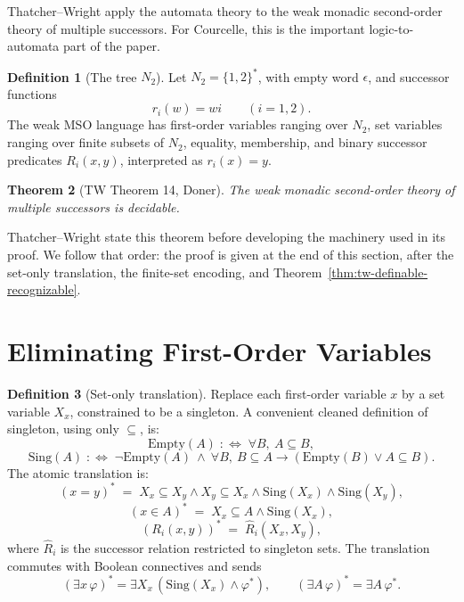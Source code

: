 \documentclass[11pt]{article}
\newtheorem{theorem}{Theorem}
\theoremstyle{definition}
\newtheorem{definition}[theorem]{Definition}
\newcommand{\TW}{Thatcher--Wright}
\begin{document}
\TW{} apply the automata theory to the weak monadic second-order theory of
multiple successors.  For Courcelle, this is the important logic-to-automata
part of the paper.

\begin{definition}[The tree \(N_2\)]
Let \(N_2=\{1,2\}^*\), with empty word \(\epsilon\), and successor functions
\[
  r_i(w)=wi \qquad (i=1,2).
\]
The weak MSO language has first-order variables ranging over \(N_2\), set
variables ranging over finite subsets of \(N_2\), equality, membership, and
binary successor predicates \(R_i(x,y)\), interpreted as \(r_i(x)=y\).
\end{definition}

\begin{theorem}[TW Theorem 14, Doner]\label{thm:tw-doner}
The weak monadic second-order theory of multiple successors is decidable.
\end{theorem}

\noindent
\TW{} state this theorem before developing the machinery used in its proof.  We
follow that order: the proof is given at the end of this section, after the
set-only translation, the finite-set encoding, and Theorem~\ref{thm:tw-definable-recognizable}.

\section{Eliminating First-Order Variables}\label{sec:tw-eliminate-first-order}

\begin{definition}[Set-only translation]
Replace each first-order variable \(x\) by a set variable \(X_x\), constrained to
be a singleton.  A convenient cleaned definition of singleton, using only
\(\subseteq\), is:
\[
  \mathrm{Empty}(A) \;:\!\!\Longleftrightarrow\; \forall B,\ A\subseteq B,
\]
\[
  \mathrm{Sing}(A) \;:\!\!\Longleftrightarrow\;
  \neg\mathrm{Empty}(A)\ \wedge\
  \forall B,\ B\subseteq A \to (\mathrm{Empty}(B)\vee A\subseteq B).
\]
The atomic translation is:
\[
  (x=y)^* \;=\; X_x\subseteq X_y\wedge X_y\subseteq X_x\wedge
  \mathrm{Sing}(X_x)\wedge
  \mathrm{Sing}(X_y),
\]
\[
  (x\in A)^* \;=\; X_x\subseteq A\wedge\mathrm{Sing}(X_x),
\]
\[
  (R_i(x,y))^* \;=\; \widehat R_i(X_x,X_y),
\]
where \(\widehat R_i\) is the successor relation restricted to singleton sets.
The translation commutes with Boolean connectives and sends
\[
  (\exists x\,\varphi)^*
  =
  \exists X_x\,(\mathrm{Sing}(X_x)\wedge\varphi^*),
  \qquad
  (\exists A\,\varphi)^*=\exists A\,\varphi^*.
\]
\end{definition}
\end{document}
